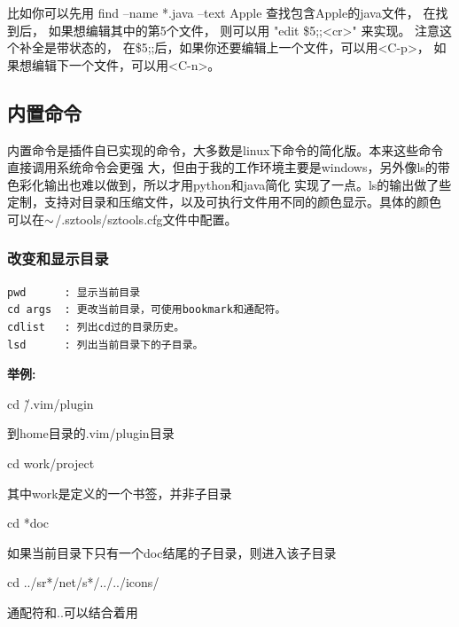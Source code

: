 \documentclass[oneside,openany]{book}
\begin{document}
  比如你可以先用 find --name *.java --text Apple 查找包含Apple的java文件， 在找到后，
如果想编辑其中的第5个文件， 则可以用 "edit \$5;;<cr>" 来实现。 注意这个补全是带状态的，
在\$5;;后，如果你还要编辑上一个文件，可以用<C-p>， 如果想编辑下一个文件，可以用<C-n>。


\subsection{内置命令}
     内置命令是插件自已实现的命令，大多数是linux下命令的简化版。本来这些命令直接调用系统命令会更强
大，但由于我的工作环境主要是windows，另外像ls的带色彩化输出也难以做到，所以才用python和java简化
实现了一点。ls的输出做了些定制，支持对目录和压缩文件，以及可执行文件用不同的颜色显示。具体的颜色
可以在$\tiny{\sim}$/.sztools/sztools.cfg文件中配置。

\subsubsection{改变和显示目录}

\begin{verbatim}
pwd      : 显示当前目录
cd args  : 更改当前目录，可使用bookmark和通配符。
cdlist   : 列出cd过的目录历史。
lsd      : 列出当前目录下的子目录。
\end{verbatim}

\begin{flushleft}\textbf{举例:}\end{flushleft}
\begin{mdframed}[style=SmallFrame] cd \~/.vim/plugin \end{mdframed}到home目录的.vim/plugin目录
\vspace{4mm}

\begin{mdframed}[style=SmallFrame] cd work/project \end{mdframed}其中work是定义的一个书签，并非子目录
\vspace{4mm}

\begin{mdframed}[style=SmallFrame] cd *doc \end{mdframed}如果当前目录下只有一个doc结尾的子目录，则进入该子目录
\vspace{4mm}

\begin{mdframed}[style=SmallFrame] cd ../sr*/net/s*/../../icons/ \end{mdframed}通配符和..可以结合着用
\vspace{4mm}
\end{document}
